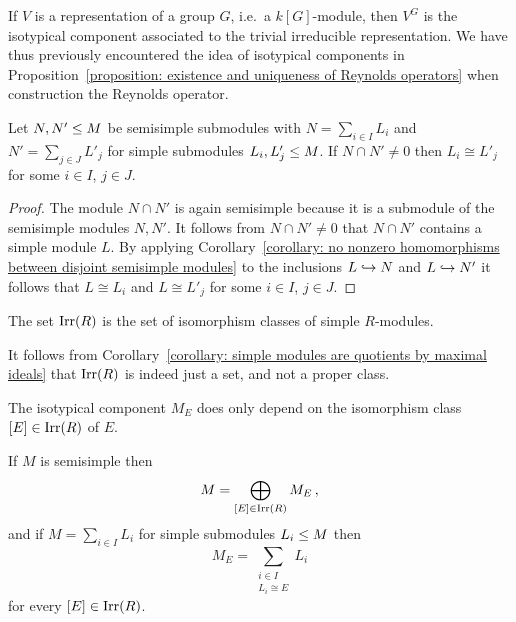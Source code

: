 \begin{example}
  If $V$ is a representation of a group $G$, i.e.\ a $k[G]$-module, then $V^G$ is the isotypical component associated to the trivial irreducible representation.
  We have thus previously encountered the idea of isotypical components in Proposition~\ref{proposition: existence and uniqueness of Reynolds operators} when construction the Reynolds operator.
\end{example}






\begin{lemma}
  \label{lemma: intersection of semisimple sums}
  Let $N, N' \leq M$ be semisimple submodules with $N = \sum_{i \in I} L_i$ and $N' = \sum_{j \in J} L'_j$ for simple submodules $L_i, L'_j \leq M$.
  If $N \cap N' \neq 0$ then $L_i \cong L'_j$ for some $i \in I$, $j \in J$.
\end{lemma}


\begin{proof}
  The module $N \cap N'$ is again semisimple because it is a submodule of the semisimple modules $N, N'$.
  It follows from $N \cap N' \neq 0$ that $N \cap N'$ contains a simple module $L$.
  By applying Corollary~\ref{corollary: no nonzero homomorphisms between disjoint semisimple modules} to the inclusions $L \hookrightarrow N$ and $L \hookrightarrow N'$ it follows that $L \cong L_i$ and $L \cong L'_j$ for some $i \in I$, $j \in J$.
\end{proof}


\begin{definition}
  The set $\operatorname{Irr}(R)$ is the set of isomorphism classes of simple $R$-modules.
\end{definition}


\begin{remark}
  It follows from Corollary~\ref{corollary: simple modules are quotients by maximal ideals} that $\operatorname{Irr}(R)$ is indeed just a set, and not a proper class.
\end{remark}


\begin{remark}
  The isotypical component $M_E$ does only depend on the isomorphism class $[E] \in \operatorname{Irr}(R)$ of $E$.
\end{remark}


\begin{theorem}
  \label{theorem: isotypical decomposition}
  If $M$ is semisimple then
  \[
      M
    = \bigoplus_{[E] \in \operatorname{Irr}(R)} M_E \,,
  \]
  and if $M = \sum_{i \in I} L_i$ for simple submodules $L_i \leq M$ then
  \[
      M_E
    = \sum_{\substack{i \in I \\ L_i \cong E}} L_i
  \]
  for every $[E] \in \operatorname{Irr}(R)$.
\end{theorem}



